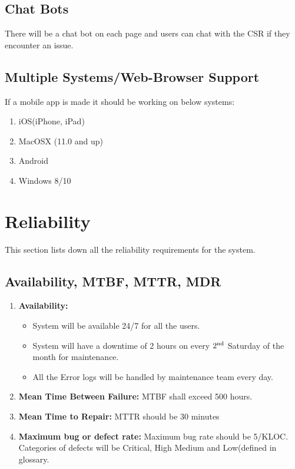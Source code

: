 \documentclass{report}
\begin{document}
\subsection{Chat Bots}
There will be a chat bot on each page and users can chat with the CSR if they encounter an issue. 

\subsection{Multiple Systems/Web-Browser Support}
If a mobile app is made it should be working on below systems:
\begin{enumerate}
    \item iOS(iPhone, iPad)
    \item MacOSX (11.0 and up)
    \item Android
    \item Windows 8/10
\end{enumerate}

\section{ Reliability}
This section lists down all the reliability requirements for the system.
\subsection{Availability, MTBF, MTTR, MDR}
\begin{enumerate}
    \item \textbf{Availability:}
    \begin{itemize}
        \item System will be available 24/7 for all the users.
        \item System will have a downtime of 2 hours on every $2\textsuperscript{nd}$ Saturday of the month for maintenance.
        \item All the Error logs will be handled by maintenance team every day.
    \end{itemize}
    \item \textbf{Mean Time Between Failure:} MTBF shall exceed 500 hours.
    \item \textbf{Mean Time to Repair:} MTTR should be 30 minutes
    \item \textbf{Maximum bug or defect rate:} Maximum bug rate should be 5/KLOC. Categories of defects will be Critical, High Medium and Low(defined in glossary.
\end{enumerate}
\end{document}
